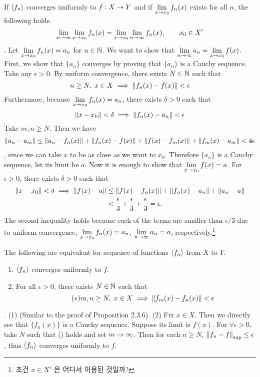  If \(\left\langle f_n \right\rangle\) converges uniformly to \(f: X\rightarrow Y\) and if \(\displaystyle \lim_{x \rightarrow x_0} f_n(x)\) exists for all \(n\), the following holds.
\[
	\lim_{n\rightarrow \infty} \lim_{x \rightarrow x_0} f_n(x) = \lim_{x \rightarrow x_0} \lim_{n \rightarrow \infty} f_n(x), \qquad x_0 \in X'
\]
\pf. Let \(\displaystyle \lim_{x \rightarrow x_0} f_n(x) = a_n\) for \(n\in \mathbb{N}\). We want to show that \(\displaystyle \lim_{n\rightarrow\infty} a_n = \lim_{x\rightarrow x_0} f(x)\).
\newline
First, we show that \(\{a_n\}\) converges by proving that \(\{a_n\}\) is a Cauchy sequence.
\newline
Take any \(\epsilon > 0\). By uniform convergence, there exists \(N\in \mathbb{N}\) such that
\[
	n\geq N, \; x \in X \implies \left\lVert f_n(x) - f(x)\right\rVert < \epsilon
\]
Furthermore, because \(\displaystyle \lim_{x\rightarrow x_0} f_n(x) = a_n\), there exists \(\delta > 0\) such that
\[
	\left\lVert x - x_0\right\rVert < \delta \implies \left\lVert f_n(x) - a_n\right\rVert < \epsilon
\]
Take \(m, n \geq N\). Then we have
\[
	\begin{aligned}
		\left\lVert a_n - a_m\right\rVert \leq \left\lVert a_n - f_n(x)\right\rVert + \left\lVert f_n(x) - f(x)\right\rVert + \left\lVert f(x) - f_m(x)\right\rVert + \left\lVert f_m(x)-a_m\right\rVert < 4\epsilon
	\end{aligned}
\]
, since we can take \(x\) to be as close as we want to \(x_0\). Therefore \(\{a_n\}\) is a Cauchy sequence, let its limit be \(a\).
\newline
Now it is enough to show that \(\displaystyle \lim_{x\rightarrow x_0} f(x) = a\). For \(\epsilon > 0\), there exists \(\delta > 0\) such that
\[
	\begin{aligned}
		\left\lVert x - x_0\right\rVert < \delta \implies
		\left\lVert f(x) - a\right\rVert & \leq \left\lVert f(x) - f_n(x)\right\rVert + \left\lVert f_n(x) - a_n\right\rVert + \left\lVert a_n - a\right\rVert           \\
		                & < \frac{\epsilon}{3} + \frac{\epsilon}{3} + \frac{\epsilon}{3} = \epsilon.
	\end{aligned}
\]
The second inequality holds because each of the terms are smaller than \(\epsilon / 3\) due to uniform convergence, \(\displaystyle \lim_{x \rightarrow x_0} f_n(x) = a_n\), \(\displaystyle \lim_{n \rightarrow \infty} a_n = a\), respectively.\footnote{조건 \(x \in X'\) 은 어디서 이용된 것일까?}

 The following are equivalent for sequence of functions \(\left\langle f_n \right\rangle\) from \(X\) to \(Y\).
\begin{enumerate}
	\item \(\left\langle f_n \right\rangle\) converges uniformly to \(f\).
	\item For all \(\epsilon > 0\), there exists \(N \in \mathbb{N}\) such that
	      \begin{equation}\tag{\textasteriskcentered}
			m, n \geq N, \; x\in X \implies \left\lVert f_m(x) - f_n(x)\right\rVert < \epsilon 
		  \end{equation}
\end{enumerate}

\pf. (1) (Similar to the proof of Proposition 2.3.6).
\newline
(2) Fix \(x\in X\). Then we directly see that \(\{f_n(x)\}\) is a Cauchy sequence. Suppose its limit is \(f(x)\). For \(\forall \epsilon > 0\), take \(N\) such that (\textasteriskcentered) holds and set \(m\rightarrow \infty\). Then for each \(n \geq N\), \(\left\lVert f_n-f\right\rVert_{\sup} \leq \epsilon\), thus \(\left\langle f_n \right\rangle\) converges uniformly to \(f\).
